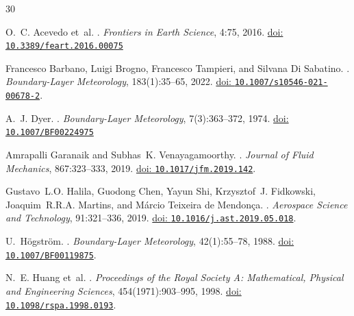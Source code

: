 
\begin{thebibliography}{30}
\providecommand{\natexlab}[1]{#1}
\providecommand{\url}[1]{\texttt{#1}}
\providecommand{\doi}[1]{\href{https://doi.org/#1}{doi: \nolinkurl{#1}}}

O.~C. Acevedo et~al.
.
\newblock \emph{Frontiers in Earth Science}, 4:75, 2016.
\newblock \doi{10.3389/feart.2016.00075}

Francesco Barbano, Luigi Brogno, Francesco Tampieri, and Silvana Di Sabatino.
.
\newblock \emph{Boundary-Layer Meteorology}, 183(1):35--65, 2022.
\newblock \doi{10.1007/s10546-021-00678-2}.

A.~J. Dyer.
.
\newblock \emph{Boundary-Layer Meteorology}, 7(3):363--372, 1974.
\newblock \doi{10.1007/BF00224975}

Amrapalli Garanaik and Subhas~K. Venayagamoorthy.
.
\newblock \emph{Journal of Fluid Mechanics}, 867:323--333, 2019.
\newblock \doi{10.1017/jfm.2019.142}.

Gustavo~L.O. Halila, Guodong Chen, Yayun Shi, Krzysztof~J. Fidkowski, Joaquim~R.R.A. Martins, and M\'arcio Teixeira de Mendon\c{c}a.
.
\newblock \emph{Aerospace Science and Technology}, 91:321--336, 2019.
\newblock \doi{10.1016/j.ast.2019.05.018}.

U.~Högström.
.
\newblock \emph{Boundary-Layer Meteorology}, 42(1):55--78, 1988.
\newblock \doi{10.1007/BF00119875}.

N.~E. Huang et~al.
.
\newblock \emph{Proceedings of the Royal Society A: Mathematical, Physical and Engineering Sciences}, 454(1971):903--995, 1998.
\newblock \doi{10.1098/rspa.1998.0193}.


\end{thebibliography}
